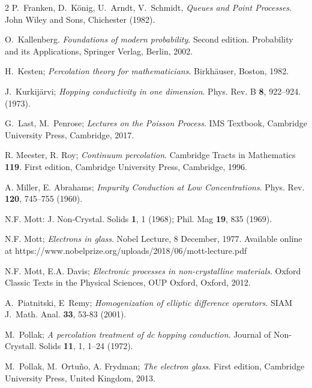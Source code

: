 \documentclass[12pt,a4paper,reqno]{amsart}
\begin{document}
\begin{thebibliography}{2}
 P.~Franken,  D.~K\"{o}nig, U.~Arndt, V.~Schmidt, \emph{Queues
and Point Processes}.
John Wiley and Sons, Chichester (1982).






  O.~Kallenberg. \emph{Foundations of modern probability}. Second edition. Probability and its Applications,  Springer Verlag, Berlin, 2002.



 H.~Kesten; \emph{Percolation theory for mathematicians}. Birkh\"auser, Boston, 1982.


 J.~Kurkij\"arvi; \emph{Hopping conductivity in one dimension}. Phys. Rev. B {\bf 8}, 922--924.
(1973).

 G.~Last, M.~Penrose; \emph{Lectures on the Poisson Process}.  IMS Textbook,  Cambridge University Press, Cambridge, 2017.

  R. Meester, R. Roy;  \emph{Continuum percolation}. Cambridge Tracts in Mathematics {\bf 119}. First edition, Cambridge University Press, Cambridge, 1996.

  A. Miller, E. Abrahams; \emph{Impurity Conduction at Low Concentrations}. Phys. Rev. {\bf 120}, 745--755 (1960).



  N.F.  Mott:  J. Non-Crystal. Solids {\bf 1}, 1 (1968);  Phil. Mag {\bf 19}, 835 (1969).

 N.F.  Mott; \emph{Electrons in glass}. 
Nobel Lecture, 8 December, 1977. Available online at https://www.nobelprize.org/uploads/2018/06/mott-lecture.pdf




 N.F. Mott, E.A. Davis; \emph{Electronic processes in non-crystalline materials}.  Oxford Classic Texts in the Physical Sciences, OUP Oxford, Oxford, 2012.


 A.~Piatnitski, E~Remy; \emph{Homogenization of elliptic difference operators}.
SIAM J.~Math. Anal. {\bf 33}, 53-83 (2001).


  M.~Pollak; \emph{A percolation treatment of dc hopping conduction}. Journal of Non-Crystall. Solids {\bf 11}, 1, 1--24 (1972).


 M.~Pollak, M.~Ortu{\~n}o, A. Frydman; \emph{The electron glass}. First edition, Cambridge University Press, United Kingdom, 2013.




\end{thebibliography}
\end{document}
